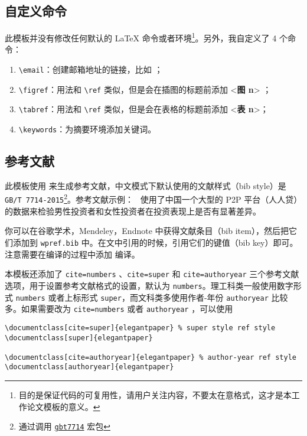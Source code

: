 \documentclass[lang=cn,11pt,a4paper]{elegantpaper}
\begin{document}
\subsection{自定义命令}
此模板并没有修改任何默认的 \LaTeX{} 命令或者环境\footnote{目的是保证代码的可复用性，请用户关注内容，不要太在意格式，这才是本工作论文模板的意义。}。另外，我自定义了 4 个命令：
\begin{enumerate}
  \item \lstinline{\email}：创建邮箱地址的链接，比如 ；
  \item \lstinline{\figref}：用法和 \lstinline{\ref} 类似，但是会在插图的标题前添加 <\textbf{图 n}> ；
  \item \lstinline{\tabref}：用法和 \lstinline{\ref} 类似，但是会在表格的标题前添加 <\textbf{表 n}>；
  \item \lstinline{\keywords}：为摘要环境添加关键词。
\end{enumerate}

\subsection{参考文献}
此模板使用  来生成参考文献，中文模式下默认使用的文献样式（bib style）是 \lstinline{GB/T 7714-2015}\footnote{通过调用 \href{https://ctan.org/pkg/gbt7714}{\lstinline{gbt7714}} 宏包}。参考文献示例：~\cite{en3} 使用了中国一个大型的 P2P 平台（人人贷）的数据来检验男性投资者和女性投资者在投资表现上是否有显著差异。

你可以在谷歌学术，Mendeley，Endnote 中获得文献条目（bib item），然后把它们添加到 \lstinline{wpref.bib} 中。在文中引用的时候，引用它们的键值（bib key）即可。注意需要在编译的过程中添加  编译。

本模板还添加了 \lstinline{cite=numbers} 、\lstinline{cite=super} 和 \lstinline{cite=authoryear}  三个参考文献选项，用于设置参考文献格式的设置，默认为 \lstinline{numbers}。理工科类一般使用数字形式 \lstinline{numbers} 或者上标形式 \lstinline{super}，而文科类多使用作者-年份 \lstinline{authoryear} 比较多。如果需要改为 \lstinline{cite=numbers}  或者  \lstinline{authoryear} ，可以使用
\begin{lstlisting}
\documentclass[cite=super]{elegantpaper} % super style ref style
\documentclass[super]{elegantpaper}

\documentclass[cite=authoryear]{elegantpaper} % author-year ref style
\documentclass[authoryear]{elegantpaper}
\end{lstlisting}
\end{document}
